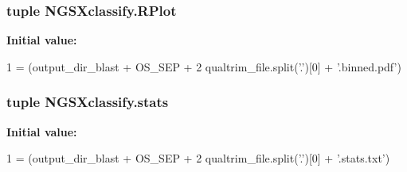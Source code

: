 \subsubsection[{\texorpdfstring{R\+Plot}{RPlot}}]{\setlength{\rightskip}{0pt plus 5cm}tuple N\+G\+S\+Xclassify.\+R\+Plot}\hypertarget{namespaceNGSXclassify_a51e44232261c893b3c3c7391de209949}{}\label{namespaceNGSXclassify_a51e44232261c893b3c3c7391de209949}
{\bfseries Initial value\+:}
\begin{DoxyCode}
1 = (output\_dir\_blast + OS\_SEP +
2                         qualtrim\_file.split(\textcolor{stringliteral}{'.'})[0] + \textcolor{stringliteral}{'.binned.pdf'})
\end{DoxyCode}
\subsubsection[{\texorpdfstring{stats}{stats}}]{\setlength{\rightskip}{0pt plus 5cm}tuple N\+G\+S\+Xclassify.\+stats}\hypertarget{namespaceNGSXclassify_a70f6b3c317a27f4eda47f2bc197b07d0}{}\label{namespaceNGSXclassify_a70f6b3c317a27f4eda47f2bc197b07d0}
{\bfseries Initial value\+:}
\begin{DoxyCode}
1 = (output\_dir\_blast + OS\_SEP +
2                         qualtrim\_file.split(\textcolor{stringliteral}{'.'})[0] + \textcolor{stringliteral}{'.stats.txt'})
\end{DoxyCode}
